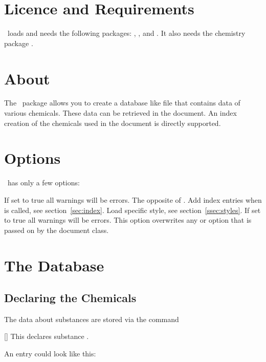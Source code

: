 \documentclass[load-preamble+]{cnltx-doc}
\begin{document}
\section{Licence and Requirements}
\license

\substances\ loads and needs the following packages: ,
,  and . It also needs the
chemistry package .

\section{About}
The \substances\ package allows you to create a database like file that contains
data of various chemicals. These data can be retrieved in the document. An index
creation of the chemicals used in the document is directly supported.

\section{Options}
\substances\ has only a few options:
\begin{options}
    If set to true all warnings will be errors.
    The opposite of .
    Add index entries when  is called, see section~\ref{sec:index}.
    Load specific style, see section~\ref{ssec:styles}.
    If set to true all warnings will be errors. This option overwrites any
     or  option that is passed on by the document
    class.
\end{options}

\section{The Database}
\subsection{Declaring the Chemicals}
The data about substances are stored via the command
\begin{commands}
  []
    This declares substance .
\end{commands}
An entry could look like this:
\begin{sourcecode}
\end{sourcecode}
\end{document}
